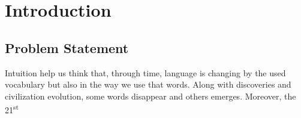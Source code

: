 \section{Introduction}

\subsection{Problem Statement}
Intuition help us think that, through time, language is changing by the used vocabulary but also in the way we use that words.
Along with discoveries and civilization evolution, some words disappear and others emerges. Moreover, the 21\textsuperscript{st}
